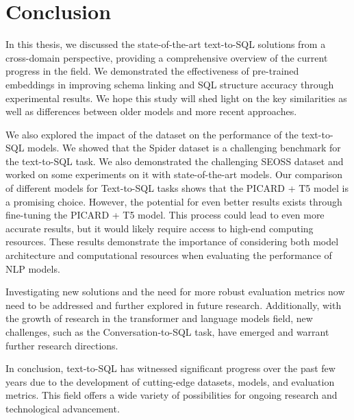 \section{Conclusion}




% 
% 
% 


In this thesis, we discussed the state-of-the-art text-to-SQL solutions from a cross-domain perspective, providing a comprehensive overview of the current progress in the field. We demonstrated the effectiveness of pre-trained embeddings in improving schema linking and SQL structure accuracy through experimental results. We hope this study will shed light on the key similarities as well as differences between older models and more recent approaches.

We also explored the impact of the dataset on the performance of the text-to-SQL models. We showed that the Spider dataset is a challenging benchmark for the text-to-SQL task. We also demonstrated the challenging SEOSS dataset and worked on some experiments on it with state-of-the-art models. Our comparison of different models for Text-to-SQL tasks shows that the PICARD + T5 model is a promising choice. However, the potential for even better results exists through fine-tuning the PICARD + T5 model. This process could lead to even more accurate results, but it would likely require access to high-end computing resources. These results demonstrate the importance of considering both model architecture and computational resources when evaluating the performance of NLP models.

Investigating new solutions and the need for more robust evaluation metrics now need to be addressed and further explored in future research. Additionally, with the growth of research in the transformer and language models field, new challenges, such as the Conversation-to-SQL task, have emerged and warrant further research directions.

In conclusion, text-to-SQL has witnessed significant progress over the past few years due to the development of cutting-edge datasets, models, and evaluation metrics. This field offers a wide variety of possibilities for ongoing research and technological advancement.